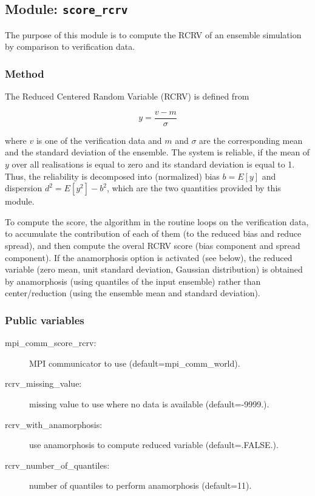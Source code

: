 \documentclass[11pt]{article}
\begin{document}
\subsection{Module: {\tt\bf score\_rcrv}}

The purpose of this module is to compute the RCRV
of an ensemble simulation by comparison to verification data.

\subsubsection*{Method}

The Reduced Centered Random Variable (RCRV) is defined from

\begin{equation}
 \label{eq:rcrv}
  y = \frac{v-m}{\sigma}
\end{equation}

\noindent
where $v$  is one of the verification data and
$m$ and $\sigma$ are the corresponding mean and the standard deviation of the ensemble.
The system is reliable, if the mean of $y$ over all realisations
is equal to zero and its standard deviation is equal to 1.
Thus, the reliability is decomposed into (normalized) bias $b=E[y]$
and dispersion $d^2=E[y^2]-b^2$, which are the two quantities
provided by this module.

To compute the score, the algorithm in the routine loops on the verification data,
to accumulate the contribution of each of them
(to the reduced bias and reduce spread),
and then compute the overal RCRV score
(bias component and spread component).
If the anamorphosis option is activated (see below),
the reduced variable (zero mean, unit standard deviation, Gaussian distribution)
is obtained by anamorphosis (using quantiles of the input ensemble)
rather than center/reduction (using the ensemble mean and standard deviation).

\subsubsection*{Public variables}

\begin{description}
\item[mpi\_comm\_score\_rcrv:] MPI communicator to use (default=mpi\_comm\_world).
\item[rcrv\_missing\_value:] missing value to use where no data is available (default=-9999.).
\item[rcrv\_with\_anamorphosis:] use anamorphosis to compute reduced variable (default=.FALSE.).
\item[rcrv\_number\_of\_quantiles:] number of quantiles to perform anamorphosis (default=11).
\end{description}
\end{document}
